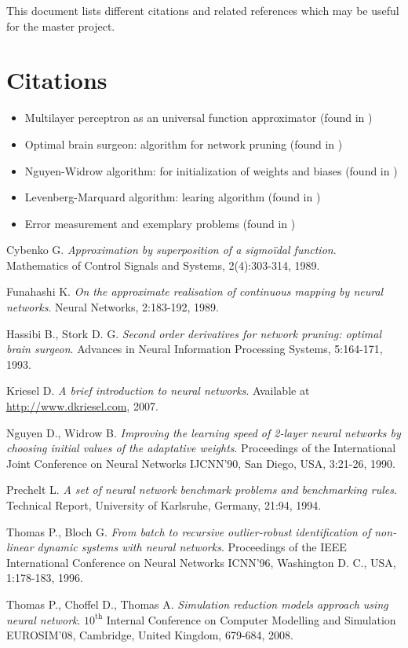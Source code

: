 \documentclass[11pt,a4paper]{article}
\theoremstyle{definition}
\theoremstyle{theorem}
\numberwithin{equation}{section}
\numberwithin{figure}{section}
\begin{document}
	This document lists different citations and related references which may be useful for the master project.
	
	\section*{Citations}
	
	\begin{itemize}
		\item Multilayer perceptron as an universal function approximator \cite{Cyb89, Fun89} (found in \cite{Tho08})
		\item Optimal brain surgeon: algorithm for network pruning \cite{Has93} (found in \cite{Tho08})
		\item Nguyen-Widrow algorithm: for initialization of weights and biases \cite{Ngu90} (found in \cite{Tho08})
		\item Levenberg-Marquard algorithm: learing algorithm \cite{Tho96} (found in \cite{Tho08})
		\item Error measurement and exemplary problems \cite{Pre94} (found in \cite{Kri07})
	\end{itemize}
	
	\begin{thebibliography}{50}
	
		Cybenko G. \emph{Approximation by superposition of a sigmoïdal function}. Mathematics of Control Signals and Systems, 2(4):303-314, 1989.
		
		Funahashi K. \emph{On the approximate realisation of continuous mapping by neural networks}. Neural Networks, 2:183-192, 1989.
		
		Hassibi B., Stork D. G. \emph{Second order derivatives for network pruning: optimal brain surgeon}. Advances in Neural Information Processing Systems, 5:164-171, 1993.
		
		Kriesel D. \emph{A brief introduction to neural networks}. Available at \url{http://www.dkriesel.com}, 2007.
		
		Nguyen D., Widrow B. \emph{Improving the learning speed of 2-layer neural networks by choosing initial values of the adaptative weights}. Proceedings of the International Joint Conference on Neural Networks IJCNN'90, San Diego, USA, 3:21-26, 1990.
		
		Prechelt L. \emph{A set of neural network benchmark problems and benchmarking rules}. Technical Report, University of Karlsruhe, Germany, 21:94, 1994.
		
		Thomas P., Bloch G. \emph{From batch to recursive outlier-robust identification of non-linear dynamic systems with neural networks}. Proceedings of the IEEE International Conference on Neural Networks ICNN'96, Washington D. C., USA, 1:178-183, 1996.
		
		Thomas P., Choffel D., Thomas A. \emph{Simulation reduction models approach using neural network}. $10^{\text{th}}$ Internal Conference on Computer Modelling and Simulation EUROSIM'08, Cambridge, United Kingdom, 679-684, 2008.
	
	\end{thebibliography}
\end{document}
